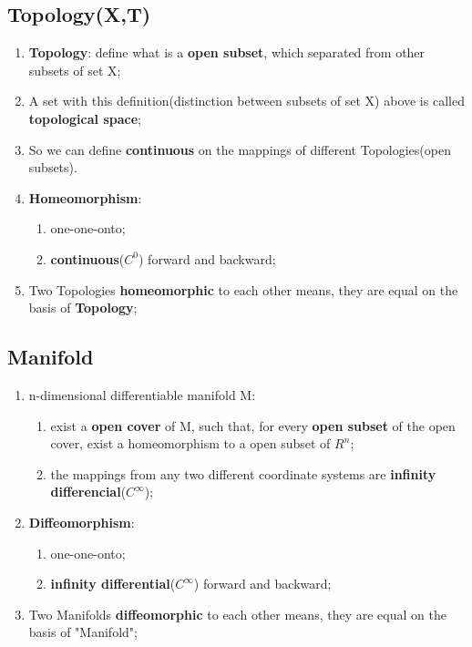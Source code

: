 \documentclass[12pt]{article}
\numberwithin{equation}{section}
\begin{document}
\subsection{Topology(X,T)}
	\begin{enumerate}
	\item \textbf{Topology}: define what is a \textbf{open subset}, which separated from other subsets of set X;
	\item A set with this definition(distinction between subsets of set X) above is called \textbf{topological space};
	\item So we can define \textbf{continuous} on the mappings of different Topologies(open subsets).
	\item \textbf{Homeomorphism}: 
		\begin{enumerate}
			\item one-one-onto; 
			\item \textbf{continuous}($C^0$) forward and backward;
		\end{enumerate}
	\item Two Topologies \textbf{homeomorphic} to each other means, they are equal on the basis of 	\textbf{Topology};
	\end{enumerate}
\subsection{Manifold}
	\begin{enumerate}
	\item n-dimensional differentiable manifold M: 
		\begin{enumerate}
			\item exist a \textbf{open cover} of M, such that, for every \textbf{open subset} of the open cover, exist a homeomorphism to a open subset of $R^n$; 
			\item the mappings from any two different coordinate systems are \textbf{infinity differencial}($C^\infty$);
		\end{enumerate}
	\item \textbf{Diffeomorphism}: 
		\begin{enumerate}
			\item one-one-onto; 
			\item \textbf{infinity differential}($C^\infty$) forward and backward;
		\end{enumerate}
	\item Two Manifolds \textbf{diffeomorphic} to each other means, they are equal on the basis of "Manifold";
	\end{enumerate}
\end{document}
